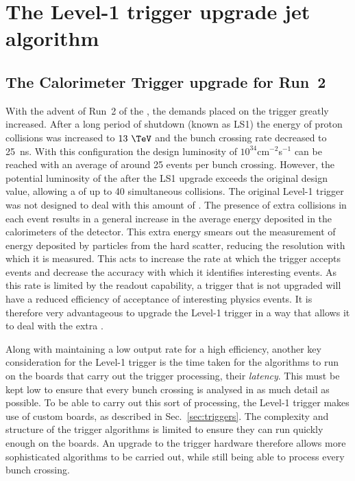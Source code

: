 \chapter{The Level-1 trigger upgrade jet algorithm}
\label{chap:l1trig}

\section{The Calorimeter Trigger upgrade for Run~2}
\label{sec:trigUpgrade}

With the advent of Run~2 of the \LHC, the demands placed on the \CMS
trigger greatly increased. After a long period of shutdown (known as
\ac{LS1}) the energy
of proton collisions was increased to $13~\tev$ and the bunch crossing
rate decreased to 25~ns. With this configuration the design luminosity
of $10^{34}$cm$^{-2}$s$^{-1}$ can be reached with an average \PU of
around 25 events per bunch crossing. However, the potential luminosity
of the \LHC after the \ac{LS1} upgrade exceeds the original design
value, allowing a \PU of up to 40 simultaneous collisions. The
original Level-1 trigger was not designed to deal with this amount of
\PU. The presence of extra collisions in each event results in a
general increase in the average energy deposited in the calorimeters
of the detector. This extra energy smears out the measurement of
energy deposited by particles from the hard scatter, reducing the
resolution with which it is measured. This acts to increase the rate
at which the trigger accepts events and decrease the accuracy with
which it identifies interesting events. As this rate is limited by the
readout capability, a trigger that is not upgraded will have a reduced
efficiency of acceptance of interesting physics events.  It is
therefore very advantageous to upgrade the Level-1 trigger in a way
that allows it to deal with the extra \PU \cite{Tapper:1556311}.

Along with maintaining a low output rate for a high efficiency,
another key consideration for the Level-1 trigger is the time taken
for
the algorithms to run on the boards that carry out the trigger
processing, their \emph{latency}. This must be kept low to ensure that
every bunch
crossing is analysed in as much detail as possible. To be able to
carry out this sort of processing, the Level-1 trigger makes use of custom
\FPGA boards, as described in Sec.~\ref{sec:triggers}. The complexity
and structure of the trigger algorithms is limited to ensure
they can run quickly enough on the \FPGA boards. An upgrade to the
trigger hardware therefore allows more sophisticated algorithms to be
carried out, while still being able to process every bunch crossing.

